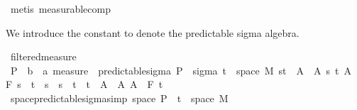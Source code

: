 \begin{isabellebody}
\ {\isacharparenleft}{\kern0pt}metis\ measurable{\isacharunderscore}{\kern0pt}comp{\isacharparenright}{\kern0pt}\isanewline
{}\isamarkupfalse%
%
\endisatagproof
{\isafoldproof}%
%
\isadelimproof
%
\endisadelimproof
%
\isadelimdocument
%
\endisadelimdocument
%
\isatagdocument
%
\isamarkuptrue%
%
\endisatagdocument
{\isafolddocument}%
%
\isadelimdocument
%
\endisadelimdocument
%
\begin{isamarkuptext}%
We introduce the constant  to denote the predictable sigma algebra.%
\end{isamarkuptext}\isamarkuptrue%
\isamarkupfalse%
\ filtered{\isacharunderscore}{\kern0pt}measure\isanewline
{}\isanewline
\isanewline
{}\isamarkupfalse%
\ {\isasymSigma}\isactrlsub P\ {\isacharcolon}{\kern0pt}{\isacharcolon}{\kern0pt}\ {\isachardoublequoteopen}{\isacharparenleft}{\kern0pt}{\isacharprime}{\kern0pt}b\ {\isasymtimes}\ {\isacharprime}{\kern0pt}a{\isacharparenright}{\kern0pt}\ measure{\isachardoublequoteclose}\ \ predictable{\isacharunderscore}{\kern0pt}sigma{\isacharcolon}{\kern0pt}\ {\isachardoublequoteopen}{\isasymSigma}\isactrlsub P\ {\isasymequiv}\ sigma\ {\isacharparenleft}{\kern0pt}{\isacharbraceleft}{\kern0pt}t\ {\isasymtimes}\ space\ M{\isacharparenright}{\kern0pt}\ {\isacharparenleft}{\kern0pt}{\isacharbraceleft}{\kern0pt}{\isacharbraceleft}{\kern0pt}s{\isacharless}{\kern0pt}{\isachardot}{\kern0pt}{\isachardot}{\kern0pt}t{\isacharbraceright}{\kern0pt}\ {\isasymtimes}\ A\ {\isacharbar}{\kern0pt}\ A\ s\ t{\isachardot}{\kern0pt}\ A\ {\isasymin}\ F\ s\ {\isasymand}\ t\ {\isasymle}\ s\ {\isasymand}\ s\ {\isacharless}{\kern0pt}\ t{\isacharbraceright}{\kern0pt}\ {\isasymunion}\ {\isacharbraceleft}{\kern0pt}{\isacharbraceleft}{\kern0pt}t\ {\isasymtimes}\ A\ {\isacharbar}{\kern0pt}\ A{\isachardot}{\kern0pt}\ A\ {\isasymin}\ F\ t\isanewline
\isanewline
{}\isamarkupfalse%
\ space{\isacharunderscore}{\kern0pt}predictable{\isacharunderscore}{\kern0pt}sigma{\isacharbrackleft}{\kern0pt}simp{\isacharbrackright}{\kern0pt}{\isacharcolon}{\kern0pt}\ {\isachardoublequoteopen}space\ {\isasymSigma}\isactrlsub P\ {\isacharequal}{\kern0pt}\ {\isacharparenleft}{\kern0pt}{\isacharbraceleft}{\kern0pt}t\ {\isasymtimes}\ space\ M{\isacharparenright}{\kern0pt}{\isachardoublequoteclose}%

\end{isabellebody}
